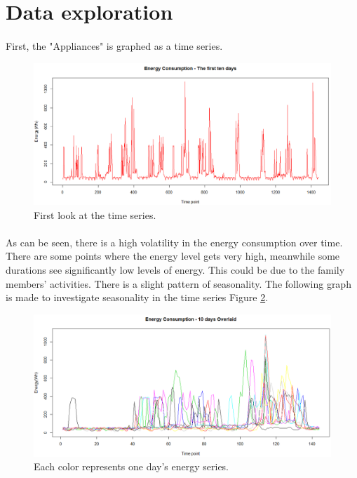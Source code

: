 \documentclass[12pt]{article}
\begin{document}
\section{Data exploration}
\paragraph{}
First, the "Appliances" is graphed as a time series.
\begin{figure}[H]
  \includegraphics[width=\linewidth]{figure2.png}
  \caption{First look at the time series.}
  \label{fig:figure2}
\end{figure}

\paragraph{}
As can be seen, there is a high volatility in the energy consumption over time. There are some points where the energy level gets very high, meanwhile some durations see significantly low levels of energy. This could be due to the family members' activities. There is a slight pattern of seasonality. The following graph is made to investigate seasonality in the time series Figure \ref{fig:figure3}.
\begin{figure}[H]
  \includegraphics[width=\linewidth]{figure3.png}
  \caption{Each color represents one day's energy series.}
  \label{fig:figure3}
\end{figure}
\end{document}
